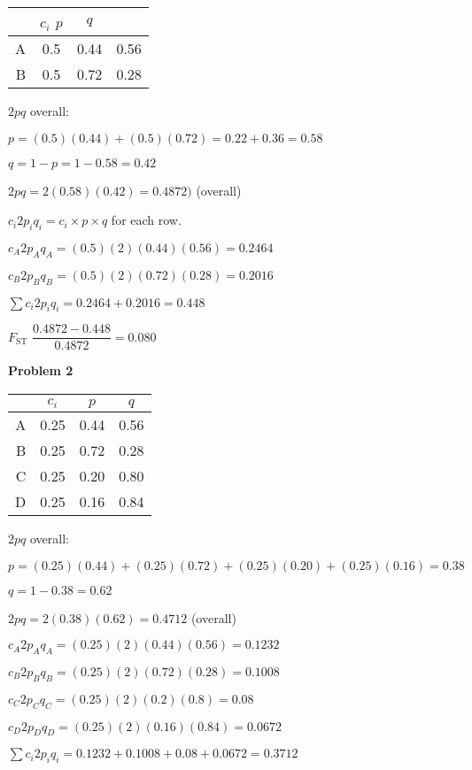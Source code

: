 \documentclass[12pt, addpoints, hidelinks]{exam}
\newcommand{\fst}{$F_{\mathrm{ST}}$}
\begin{document}
\begin{questions}
\begin{multicols}{2}
	\begin{tabular}{rccc}
	\toprule
	& $c_i$ $p$ & $q$  \tabularnewline
	\midrule
	A & 0.5 & 0.44 & 0.56  \tabularnewline
	B & 0.5 & 0.72 & 0.28  \tabularnewline
	\bottomrule

\end{tabular}

			$2pq$ overall:

			$p = (0.5)(0.44) + (0.5)(0.72) = 0.22 + 0.36 = 0.58$

			$q = 1 - p = 1 - 0.58 = 0.42$

			$2pq = 2(0.58)(0.42) = 0.4872) $ (overall)

			$c_i2p_iq_i = c_i \times p \times q$ for each row.
			
			$c_A2p_Aq_A = (0.5)(2)(0.44)(0.56) = 0.2464$
			
			$c_B2p_Bq_B = (0.5)(2)(0.72)(0.28) = 0.2016$

			$\sum c_i 2p_iq_i = 0.2464 + 0.2016 = 0.448$ 

			 \fst{} $\dfrac{0.4872 - 0.448}{0.4872} = 0.080$ 

\end{multicols}

\vspace{2\baselineskip}

\begin{multicols}{2}
\textbf{Problem 2}

	\begin{tabular}{rccc}
	\toprule
	& $c_i$ & $p$  & $q$ \tabularnewline
	\midrule
	A & 0.25  & 0.44 & 0.56 \tabularnewline
	B & 0.25  & 0.72 & 0.28 \tabularnewline
	C & 0.25  & 0.20 & 0.80 \tabularnewline
	D & 0.25  & 0.16 & 0.84 \tabularnewline
	\bottomrule
\end{tabular}

			$2pq$ overall:

			$p = (0.25)(0.44) + (0.25)(0.72) + (0.25)(0.20) + (0.25)(0.16) = 0.38$
			
			$q = 1 - 0.38 = 0.62$
			
			$2pq = 2(0.38)(0.62) = 0.4712$ (overall)
			
			$c_A2p_Aq_A = (0.25)(2)(0.44)(0.56) = 0.1232$
			
			$c_B2p_Bq_B = (0.25)(2)(0.72)(0.28) = 0.1008$
			
			$c_C2p_Cq_C = (0.25)(2)(0.2)(0.8) = 0.08$
			
			$c_D2p_Dq_D = (0.25)(2)(0.16)(0.84) = 0.0672$
			
			$\sum c_i 2p_iq_i = 0.1232 + 0.1008 + 0.08 + 0.0672 = 0.3712$
			

\end{multicols}
\end{questions}
\end{document}
